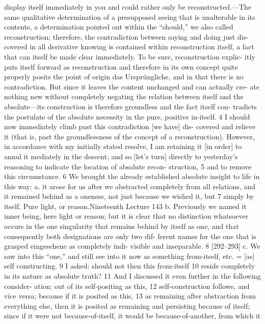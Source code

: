 display itself immediately in you and could rather only be reconstructed.—The
same qualitative determination of a presupposed seeing that is unalterable in its
contents, a determination pointed out within the “should,” we also called
reconstruction; therefore, the contradiction between saying and doing just dis-
covered in all derivative knowing is contained within reconstruction itself, a
fact that can itself be made clear immediately. To be sure, reconstruction explic-
itly puts itself forward as reconstruction and therefore in its own concept quite
properly posits the point of origin {das Ursprüngliche}, and in that there is no
contradiction. But since it leaves the content unchanged and can actually cre-
ate nothing new without completely negating the relation between itself and
the absolute—its construction is therefore groundless and the fact itself con-
tradicts the postulate of the absolute necessity in the pure, positive in-itself. 4
I should now immediately climb past this contradiction [we have] dis-
covered and relieve it (that is, past the groundlessness of the concept of a
reconstruction). However, in accordance with my initially stated resolve, I am
retaining it [in order] to annul it mediately in the descent; and so [let’s turn]
directly to yesterday’s reasoning to indicate the location of absolute recon-
struction, 5 and to remove this circumstance. 6
We brought the already established absolute insight to life in this way:
a. it arose for us after we abstracted completely from all relations, and it
remained behind as a oneness, not just because we wished it, but 7 simply by
itself. Pure light, or reason.Nineteenth Lecture
143
b. Previously we named it inner being, here light or reason; but it is clear that
no distinction whatsoever occurs in the one singularity that remains behind
by itself as one, and that consequently both designations are only two dif-
ferent names for the one that is grasped {eingesehene} as completely indi-
visible and inseparable. 8 [292–293]
c. We saw into this “one,” and still see into it now as something from-itself,
etc. = [as] self constructing. 9
I asked: should not then this from-itself 10 reside completely in its nature
as absolute truth? 11 And I discussed it even further in the following consider-
ation: out of its self-positing as this, 12 self-construction follows, and vice versa;
because if it is posited as this, 13 as remaining after abstraction from everything
else, then it is posited as remaining and persisting because of itself; since if it
were not because-of-itself, it would be because-of-another, from which it
